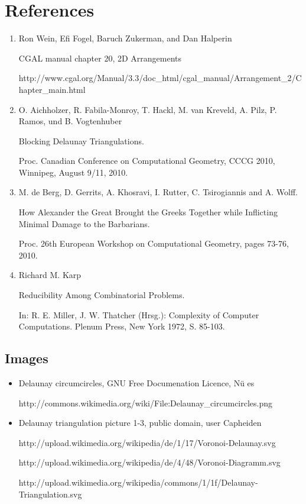 \documentclass[a4paper,12pt]{article}
\begin{document}
\section{References}
\small
\begin{enumerate}
\item
\label{ref:cgal}
Ron Wein, Efi Fogel, Baruch Zukerman, and Dan Halperin

CGAL manual chapter 20, 2D Arrangements

http://www.cgal.org/Manual/3.3/doc\_html/cgal\_manual/Arrangement\_2/Chapter\_main.html

\item
\label{ref:blocking}
O. Aichholzer, R. Fabila-Monroy, T. Hackl, M. van Kreveld, A. Pilz, P. Ramos, und B. Vogtenhuber

Blocking Delaunay Triangulations. 

Proc. Canadian Conference on Computational Geometry, CCCG 2010, Winnipeg, August 9/11, 2010. 


\item
\label{ref:alexander}
M. de Berg, D. Gerrits, A. Khosravi, I. Rutter, C. Tsirogiannis and A. Wolff.

How Alexander the Great Brought the Greeks Together while Inflicting Minimal Damage to the Barbarians.

Proc. 26th European Workshop on Computational Geometry, pages 73-76, 2010.

\item
\label{ref:karp}
Richard M. Karp

Reducibility Among Combinatorial Problems.

In: R. E. Miller, J. W. Thatcher (Hrsg.): Complexity of Computer Computations. Plenum Press, New York 1972, S. 85-103.

\end{enumerate}


\subsection*{Images}
\begin{itemize}
\item
Delaunay circumcircles, GNU Free Documenation Licence, N\"u es

http://commons.wikimedia.org/wiki/File:Delaunay\_circumcircles.png

\item
Delaunay triangulation picture 1-3, public domain, user Capheiden 

http://upload.wikimedia.org/wikipedia/de/1/17/Voronoi-Delaunay.svg

http://upload.wikimedia.org/wikipedia/de/4/48/Voronoi-Diagramm.svg

http://upload.wikimedia.org/wikipedia/commons/1/1f/Delaunay-Triangulation.svg

\end{itemize}
\end{document}
